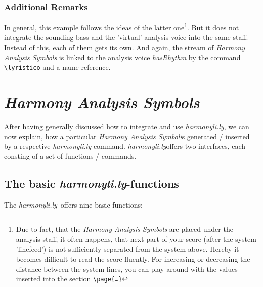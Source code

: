 \documentclass[
  DIV=calc,
  BCOR=5mm,
  12pt,
  headings=small,
  oneside,
  abstract=true,
  toc=bib,
  xcolor=dvipsnames,
  openany,
  ngerman,english]{scrartcl}
\newcommand{\acc}[0]{\textit}
\newcommand{\hlyn}[0]{\textit{harmonyli.ly}}
\newcommand{\has}[1]{\textit{Harmony Analysis Symbol#1}}
\begin{document}
\subsubsection{Additional Remarks}

In general, this example follows the ideas of the latter one\footnote{Due to
fact, that the \has{s} are placed under the analysis staff, it often happens,
that next part of your score (after the system 'linefeed') is not sufficiently
separated from the system above. Hereby it becomes difficult to read the score
fluently. For increasing or decreasing the distance between the system lines,
you can play around with the values inserted into the section
\texttt{\textbackslash page\{\ldots\}}}. But it does not integrate the sounding
bass and the 'virtual' analysis voice into the same staff. Instead of this, each
of them gets its own. And again, the stream of \has{s} is linked to the
analysis voice \acc{hasRhythm} by the command \texttt{\textbackslash lyristico}
and a name reference.

\section{\has{s}}

After having generally discussed how to integrate and use \hlyn, we can now
explain, how a particular \has is generated / inserted by a respective \hlyn
command. \hlyn offers two interfaces, each consting of a set of functions / commands.

\subsection{The basic \hlyn-functions}
The \hlyn\ offers nine basic functions:
\end{document}

